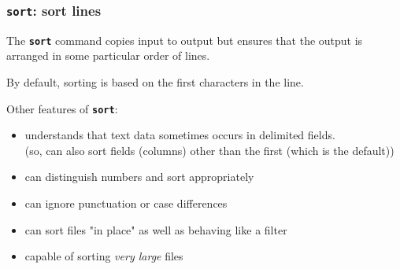 \begin{frame}
\frametitle{\textbf{\tt{sort}}: sort lines}
The \textbf{\tt{sort}} command copies input to output but ensures that the
output is arranged in some particular order of lines.

By default, sorting is based on the first characters in the line.

Other features of \textbf{\tt{sort}}:
\begin{itemize}
\item  understands that text data sometimes occurs in delimited fields. \\
(so, can also sort fields (columns) other than the first {\small (which is the default)})
\item  can distinguish numbers and sort appropriately
\item  can ignore punctuation or case differences
\item  can sort files "in place" as well as behaving like a filter
\item  capable of sorting {\it{very large}} files
\end{itemize}
\end{frame}

